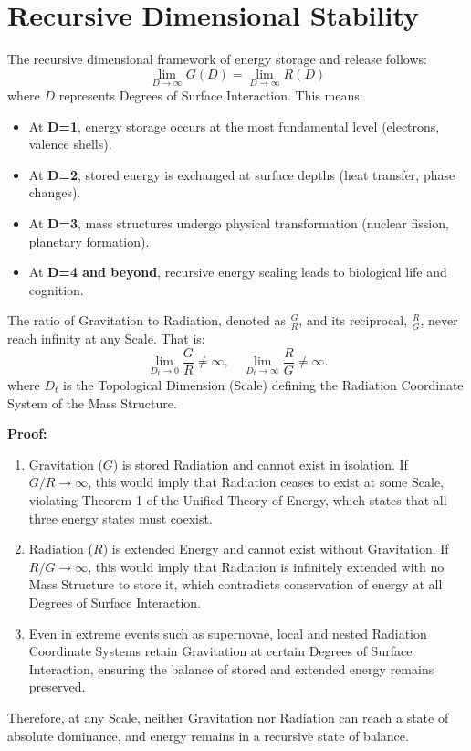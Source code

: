 \documentclass{article}
\begin{document}
\section{Recursive Dimensional Stability}
The recursive dimensional framework of energy storage and release follows:
\begin{equation}
    \lim_{D \to \infty} G(D) = \lim_{D \to \infty} R(D)
\end{equation}
where $D$ represents Degrees of Surface Interaction. This means:
\begin{itemize}
    \item At \textbf{D=1}, energy storage occurs at the most fundamental level (electrons, valence shells).
    \item At \textbf{D=2}, stored energy is exchanged at surface depths (heat transfer, phase changes).
    \item At \textbf{D=3}, mass structures undergo physical transformation (nuclear fission, planetary formation).
    \item At \textbf{D=4 and beyond}, recursive energy scaling leads to biological life and cognition.
\end{itemize}

\begin{theorem}
    The ratio of Gravitation to Radiation, denoted as \( \frac{G}{R} \), and its reciprocal, \( \frac{R}{G} \), never reach infinity at any Scale. That is:
    \begin{equation}
        \lim_{D_t \to 0} \frac{G}{R} \neq \infty, \quad \lim_{D_t \to \infty} \frac{R}{G} \neq \infty.
    \end{equation}
    where \( D_t \) is the Topological Dimension (Scale) defining the Radiation Coordinate System of the Mass Structure.
    
    \textbf{Proof:}  
    \begin{enumerate}
        \item Gravitation (\( G \)) is stored Radiation and cannot exist in isolation. If \( G/R \to \infty \), this would imply that Radiation ceases to exist at some Scale, violating Theorem 1 of the Unified Theory of Energy, which states that all three energy states must coexist.
        \item Radiation (\( R \)) is extended Energy and cannot exist without Gravitation. If \( R/G \to \infty \), this would imply that Radiation is infinitely extended with no Mass Structure to store it, which contradicts conservation of energy at all Degrees of Surface Interaction.
        \item Even in extreme events such as supernovae, local and nested Radiation Coordinate Systems retain Gravitation at certain Degrees of Surface Interaction, ensuring the balance of stored and extended energy remains preserved.
    \end{enumerate}
    Therefore, at any Scale, neither Gravitation nor Radiation can reach a state of absolute dominance, and energy remains in a recursive state of balance.
\end{theorem}
\end{document}
